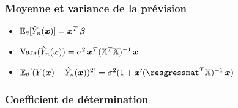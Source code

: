 \begin{frame}
\frametitle{Moyenne et variance de la prévision}
\begin{theorem}
\begin{itemize}
\item $\operatorname{{\mathbb E}}_{\theta}[\hat{Y}_n(\operatorname{\boldsymbol{x}})]= \operatorname{\boldsymbol{x}}^T \boldsymbol{\beta}$ 
\item $\operatorname{\mathrm{Var}}_{\theta}(\hat{Y}_n(\operatorname{\boldsymbol{x}}))= \sigma^2 \operatorname{\boldsymbol{x}}^T (\mathbb{X}^T \mathbb{X})^{-1} \operatorname{\boldsymbol{x}}$ 
\item $\PE_{\truetheta}[ (Y(\bx) - \hat{Y}_n(\bx))^2]= \sigma^2 (1 + \bx' (\resgressmat^T \regressmat)^{-1} \bx)$
\end{itemize}
\end{theorem}
\end{frame}


\begin{frame}
\frametitle{Coefficient de détermination}

\end{frame}

